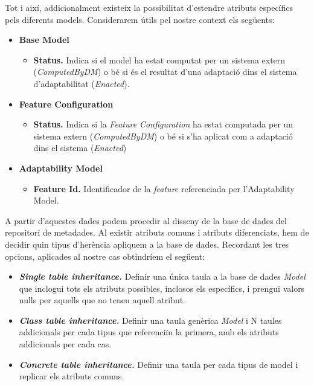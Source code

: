 Tot i així, addicionalment existeix la possibilitat d'estendre atributs específics pels diferents models. Considerarem útils pel nostre context els següents:

\begin{itemize}
\item \textbf{Base Model}
\begin{itemize}
\item \textbf{Status.} Indica si el model ha estat computat per un sistema extern (\textit{ComputedByDM}) o bé si és el resultat d'una adaptació dins el sistema d'adaptabilitat (\textit{Enacted}).
\end{itemize}
\item \textbf{Feature Configuration}
\begin{itemize}
\item \textbf{Status.} Indica si la \textit{Feature Configuration} ha estat computada per un sistema extern (\textit{ComputedByDM}) o bé si s'ha aplicat com a adaptació dins el sistema (\textit{Enacted})
\end{itemize}
\item \textbf{Adaptability Model}
\begin{itemize}
\item \textbf{Feature Id.} Identificador de la \textit{feature} referenciada per l'Adaptability Model.
\end{itemize}
\end{itemize}

A partir d'aquestes dades podem procedir al disseny de la base de dades del repositori de metadades. Al existir atributs comuns i atributs diferenciats, hem de decidir quin tipus d'herència apliquem a la base de dades. Recordant les tres opcions, aplicades al nostre cas obtindríem el següent:

\begin{itemize}
\item \textbf{\textit{Single table inheritance.}} Definir una única taula a la base de dades \textit{Model} que inclogui tots els atributs possibles, inclosos els específics, i prengui valors nulls per aquells que no tenen aquell atribut.
\item \textbf{\textit{Class table inheritance.}} Definir una taula genèrica \textit{Model} i N taules addicionals per cada tipus que referenciïn la primera, amb els atributs addicionals per cada cas.
\item \textbf{\textit{Concrete table inheritance.}} Definir una taula per cada tipus de model i replicar els atributs comuns.
\end{itemize}

